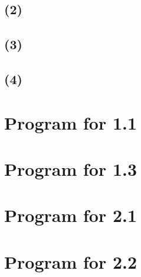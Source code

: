 \documentclass[10pt]{article}
\begin{document}
\subsection*{(2)}


\subsection*{(3)}


\subsection*{(4)}


\newpage
\begin{appendix}
\section{Program for 1.1}
\label{a:1.1}

\newpage
\section{Program for 1.3}
\label{a:1.3}

\newpage
\section{Program for 2.1}
\label{a:2.1}

\newpage
\section{Program for 2.2}
\label{a:2.2}

\end{appendix}
\end{document}
